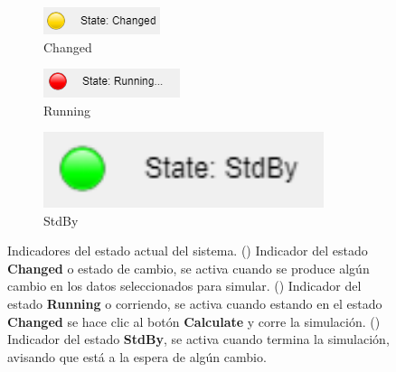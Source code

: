 	\begin{figure}[H]
	\centering
	\begin{subfigure}[b]{0.3\textwidth}
	\centering
	\includegraphics[width=\textwidth]{figuras/Procedimiento_Simulaciones/Radiacion/estado_changed}%
	\caption{Changed}%
	\label{fig:indicador_Changed2}%
	\end{subfigure}
	\hfill
	\begin{subfigure}[b]{0.3\textwidth}
	\centering
	\includegraphics[width=\textwidth]{figuras/Procedimiento_Simulaciones/Radiacion/estado_running}%
	\caption{Running}%
	\label{fig:indicador_Running2}%
	\end{subfigure}
	\hfill
	\begin{subfigure}[b]{0.3\textwidth}
	\centering
	\includegraphics[width=0.9\textwidth]{figuras/Procedimiento_Simulaciones/Radiacion/estado_stdby}%
	\caption{StdBy}%
	\label{fig:indicador_StdBy2}%
	\end{subfigure}
	\hfill
	\caption{Indicadores del estado actual del sistema. () Indicador del estado \textbf{Changed} o estado de cambio, se activa cuando se produce algún cambio en los datos seleccionados para simular. () Indicador del estado \textbf{Running} o corriendo, se activa cuando estando en el estado \textbf{Changed} se hace clic al botón \textbf{Calculate} y corre la simulación. () Indicador del estado \textbf{StdBy}, se activa cuando termina la simulación, avisando que está a la espera de algún cambio.}
	\label{fig:indicadorLED2}
	\end{figure}
